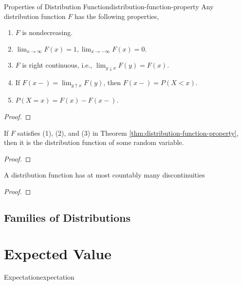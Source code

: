 \begin{theorem}{Properties of Distribution Function}{distribution-function-property}
    Any distribution function $F$ has the following properties,
    \begin{enumerate}
        \item $F$ is nondecreasing.
        \item $\lim_{x\rightarrow\infty}F(x)=1,\lim_{x \rightarrow-\infty}F(x)=0$.
        \item $F$ is right continuous, i.e., $\lim_{y \downarrow x} F(y)=F(x)$.
        \item If $F(x-)=\lim_{y\uparrow x}F(y)$, then $F(x-)=P(X<x)$.
        \item $P(X=x)=F(x)-F(x-)$.
    \end{enumerate}
\end{theorem}

\begin{proof}

\end{proof}

\begin{theorem}{}{}
    If $F$ satisfies (1), (2), and (3) in Theorem \ref{thm:distribution-function-property}, then it is the distribution function of some random variable.
\end{theorem}

\begin{proof}

\end{proof}

\begin{theorem}{}{}
    A distribution function has at most countably many discontinuities
\end{theorem}

\begin{proof}

\end{proof}

\subsection{Families of Distributions}


\section{Expected Value}

\begin{definition}{Expectation}{expectation}

\end{definition}

